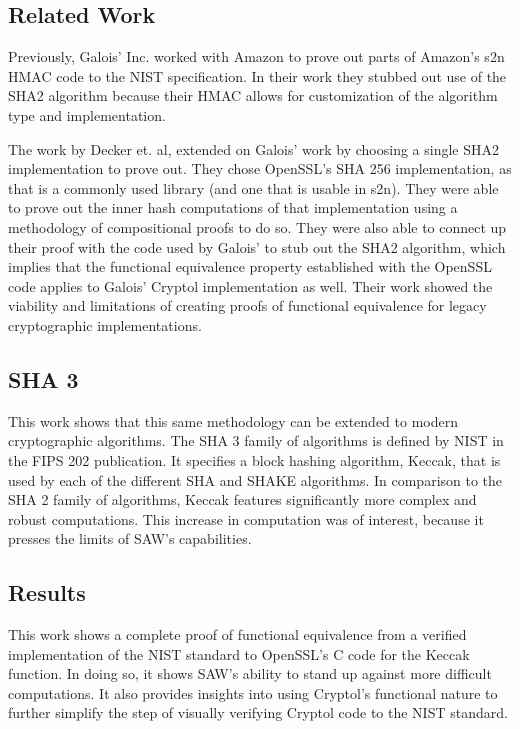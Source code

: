\subsection{Related Work}
  Previously, Galois’ Inc. worked with Amazon to prove out parts of Amazon’s s2n HMAC code to the NIST specification.  
In their work they stubbed out use of the SHA2 algorithm because their HMAC allows for customization of the algorithm type and implementation.

The work by Decker et. al, extended on Galois' work by choosing a single SHA2 implementation to prove out.  
They chose OpenSSL’s SHA 256 implementation, as that is a commonly used library (and one that is usable in s2n).  
They were able to prove out the inner hash computations of that implementation using a methodology of compositional proofs to do so.  
They were also able to connect up their proof with the code used by Galois’ to stub out the SHA2 algorithm, which implies that the functional equivalence property established with the OpenSSL code applies to Galois' Cryptol implementation as well.  
Their work showed the viability and limitations of creating proofs of functional equivalence for legacy cryptographic implementations.

\subsection{SHA 3}
This work shows that this same methodology can be extended to modern cryptographic algorithms.
The SHA 3 family of algorithms is defined by NIST in the FIPS 202 publication.
It specifies a block hashing algorithm, Keccak, that is used by each of the different SHA and SHAKE algorithms.
In comparison to the SHA 2 family of algorithms, Keccak features significantly more complex and robust computations.
This increase in computation was of interest, because it presses the limits of SAW's capabilities.

\subsection{Results}
This work shows a complete proof of functional equivalence from a verified implementation of the NIST standard to OpenSSL's C code for the Keccak function.
In doing so, it shows SAW's ability to stand up against more difficult computations.
It also provides insights into using Cryptol's functional nature to further simplify the step of visually verifying Cryptol code to the NIST standard.